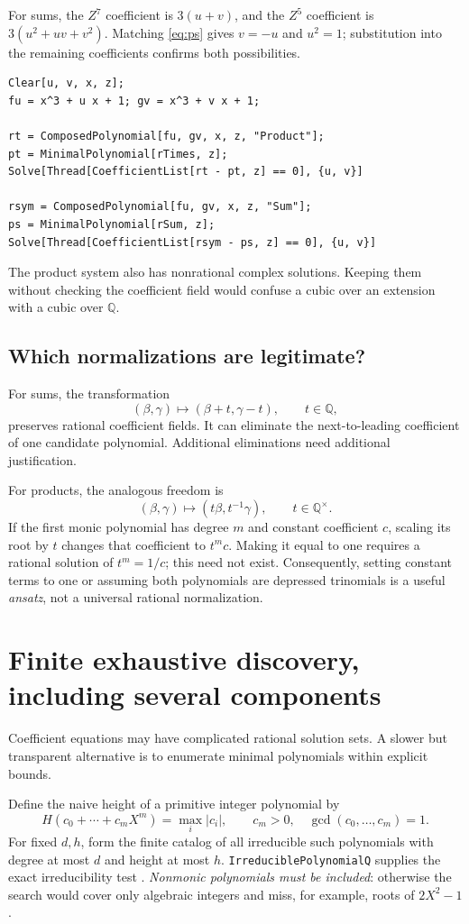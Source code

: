 \documentclass[11pt,a4paper]{article}
\newcommand{\Q}{\mathbb Q}
\newcommand{\code}[1]{\texttt{#1}}
\theoremstyle{definition}
\theoremstyle{remark}
\begin{document}
For sums, the $Z^7$ coefficient is $3(u+v)$, and the $Z^5$ coefficient is $3(u^2+uv+v^2)$. Matching \eqref{eq:ps} gives $v=-u$ and $u^2=1$; substitution into the remaining coefficients confirms both possibilities.
\begin{lstlisting}
Clear[u, v, x, z];
fu = x^3 + u x + 1; gv = x^3 + v x + 1;

rt = ComposedPolynomial[fu, gv, x, z, "Product"];
pt = MinimalPolynomial[rTimes, z];
Solve[Thread[CoefficientList[rt - pt, z] == 0], {u, v}]

rsym = ComposedPolynomial[fu, gv, x, z, "Sum"];
ps = MinimalPolynomial[rSum, z];
Solve[Thread[CoefficientList[rsym - ps, z] == 0], {u, v}]
\end{lstlisting}
The product system also has nonrational complex solutions. Keeping them without checking the coefficient field would confuse a cubic over an extension with a cubic over $\Q$.

\subsection{Which normalizations are legitimate?}
For sums, the transformation
\[
 (\beta,\gamma)\longmapsto(\beta+t,\gamma-t),\qquad t\in\Q,
\]
preserves rational coefficient fields. It can eliminate the next-to-leading coefficient of one candidate polynomial. Additional eliminations need additional justification.

For products, the analogous freedom is
\[
 (\beta,\gamma)\longmapsto(t\beta,t^{-1}\gamma),\qquad t\in\Q^\times.
\]
If the first monic polynomial has degree $m$ and constant coefficient $c$, scaling its root by $t$ changes that coefficient to $t^m c$. Making it equal to one requires a rational solution of $t^m=1/c$; this need not exist. Consequently, setting constant terms to one or assuming both polynomials are depressed trinomials is a useful \emph{ansatz}, not a universal rational normalization.

\section{Finite exhaustive discovery, including several components}
\label{sec:bounded}
Coefficient equations may have complicated rational solution sets. A slower but transparent alternative is to enumerate minimal polynomials within explicit bounds.

Define the naive height of a primitive integer polynomial by
\[
 H(c_0+\cdots+c_mX^m)=\max_i|c_i|,
 \qquad c_m>0,\quad\gcd(c_0,\ldots,c_m)=1.
\]
For fixed $d,h$, form the finite catalog of all irreducible such polynomials with degree at most $d$ and height at most $h$. \code{IrreduciblePolynomialQ} supplies the exact irreducibility test \cite{irreducible}. \emph{Nonmonic polynomials must be included}: otherwise the search would cover only algebraic integers and miss, for example, roots of $2X^2-1$.
\end{document}
